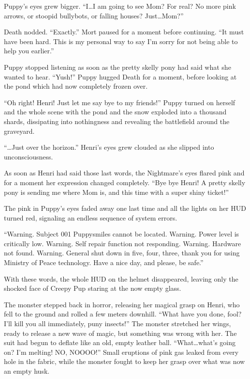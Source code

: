 Puppy's eyes grew bigger. ``I\dots I am going to see Mom? For real? No more pink arrows, or stoopid bullybots, or falling houses? Just\dots Mom?''

Death nodded. ``Exactly.'' Mort paused for a moment before continuing. ``It must have been hard. This is my personal way to say I'm sorry for not being able to help you earlier.''

Puppy stopped listening as soon as the pretty skelly pony had said what she wanted to hear. ``Yush!'' Puppy hugged Death for a moment, before looking at the pond which had now completely frozen over.

``Oh right! Henri! Just let me say bye to my friends!'' Puppy turned on herself and the whole scene with the pond and the snow exploded into a thousand shards, dissipating into nothingness and revealing the battlefield around the graveyard.


\horizonline


``\dots Just over the horizon.'' Henri's eyes grew clouded as she slipped into unconsciousness.

As soon as Henri had said those last words, the Nightmare's eyes flared pink and for a moment her expression changed completely. ``Bye bye Henri! A pretty skelly pony is sending me where Mom is, and this time with a super shiny ticket!''

The pink in Puppy's eyes faded away one last time and all the lights on her HUD turned red, signaling an endless sequence of system errors.

{\mt ``Warning. Subject 001 Puppysmiles cannot be located. Warning. Power level is critically low. Warning. Self repair function not responding. Warning. Hardware not found. Warning. General shut down in five, four, three, thank you for using Ministry of Peace technology. Have a nice day, and please, be safe.''}

With these words, the whole HUD on the helmet disappeared, leaving only the shocked face of Creepy Pup staring at the now empty glass.

The monster stepped back in horror, releasing her magical grasp on Henri, who fell to the ground and rolled a few meters downhill. ``What have you done, fool? I'll kill you all immediately, puny insects!'' The monster stretched her wings, ready to release a new wave of magic, but something was wrong with her. The suit had begun to deflate like an old, empty leather ball. ``What\dots what's going on? I'm melting! NO, NOOOO!'' Small eruptions of pink gas leaked from every hole in the fabric, while the monster fought to keep her grasp over what was now an empty husk.

